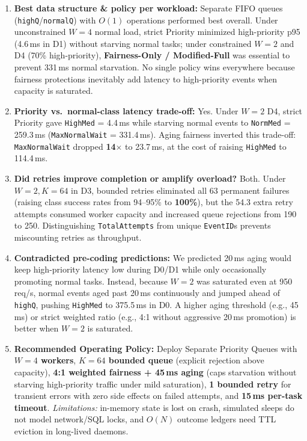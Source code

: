 \documentclass[11pt]{article}
\begin{document}
\begin{enumerate}[itemsep=0.16em, topsep=0.12em]
    \item \textbf{Best data structure \& policy per workload:} Separate FIFO queues (\texttt{highQ}/\texttt{normalQ}) with $O(1)$ operations performed best overall. Under unconstrained $W=4$ normal load, strict Priority minimized high-priority p95 (4.6\,ms in D1) without starving normal tasks; under constrained $W=2$ and D4 (70\% high-priority), \textbf{Fairness-Only / Modified-Full} was essential to prevent 331\,ms normal starvation. No single policy wins everywhere because fairness protections inevitably add latency to high-priority events when capacity is saturated.
    \item \textbf{Priority vs.\ normal-class latency trade-off:} Yes. Under $W=2$ D4, strict Priority gave \texttt{HighMed} = 4.4\,ms while starving normal events to \texttt{NormMed} = 259.3\,ms (\texttt{MaxNormalWait} = 331.4\,ms). Aging fairness inverted this trade-off: \texttt{MaxNormalWait} dropped \textbf{14$\times$} to 23.7\,ms, at the cost of raising \texttt{HighMed} to 114.4\,ms.
    \item \textbf{Did retries improve completion or amplify overload?} Both. Under $W=2, K=64$ in D3, bounded retries eliminated all 63 permanent failures (raising class success rates from 94--95\% to \textbf{100\%}), but the 54.3 extra retry attempts consumed worker capacity and increased queue rejections from 190 to 250. Distinguishing \texttt{TotalAttempts} from unique \texttt{EventID}s prevents miscounting retries as throughput.
    \item \textbf{Contradicted pre-coding predictions:} We predicted 20\,ms aging would keep high-priority latency low during D0/D1 while only occasionally promoting normal tasks. Instead, because $W=2$ was saturated even at 950\,req/s, normal events aged past 20\,ms continuously and jumped ahead of \texttt{highQ}, pushing \texttt{HighMed} to 375.5\,ms in D0. A higher aging threshold (e.g., 45\,ms) or strict weighted ratio (e.g., 4:1 without aggressive 20\,ms promotion) is better when $W=2$ is saturated.
    \item \textbf{Recommended Operating Policy:} Deploy Separate Priority Queues with \textbf{$W=4$ workers}, \textbf{$K=64$ bounded queue} (explicit rejection above capacity), \textbf{4:1 weighted fairness + 45\,ms aging} (caps starvation without starving high-priority traffic under mild saturation), \textbf{1 bounded retry} for transient errors with zero side effects on failed attempts, and \textbf{15\,ms per-task timeout}. \textit{Limitations:} in-memory state is lost on crash, simulated sleeps do not model network/SQL locks, and $O(N)$ outcome ledgers need TTL eviction in long-lived daemons.
\end{enumerate}
\end{document}
